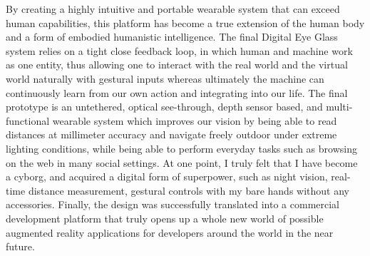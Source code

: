By creating a highly intuitive and portable wearable system that can exceed human capabilities, this platform has become a true extension of the human body and a form of embodied humanistic intelligence.  The final Digital Eye Glass system relies on a tight close feedback loop, in which human and machine work as one entity, thus allowing one to interact with the real world and the virtual world naturally with gestural inputs whereas ultimately the machine can continuously learn from our own action and integrating into our life. The final prototype is an untethered, optical see-through, depth sensor based, and multi-functional wearable system which improves our vision by being able to read distances at millimeter accuracy and navigate freely outdoor under extreme lighting conditions, while being able to perform everyday tasks such as browsing on the web in many social settings.  At one point, I truly felt that I have become a cyborg, and acquired a digital form of superpower, such as night vision, real-time distance measurement, gestural controls with my bare hands without any accessories.  Finally, the design was successfully translated into a commercial development platform that truly opens up a whole new world of possible augmented reality applications for developers around the world in the near future.

